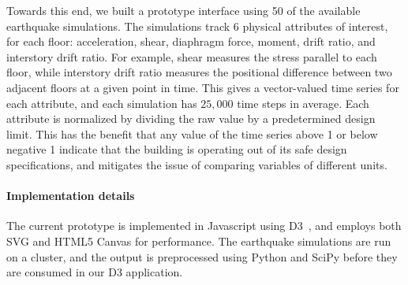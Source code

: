 Towards this end, we built a prototype interface using 50 of the available earthquake simulations.
The simulations track 6 physical attributes of interest, for each floor: acceleration, shear, diaphragm force, moment, drift ratio, and interstory drift ratio. For example, shear measures the stress parallel to each floor, while interstory drift ratio measures the positional difference between two adjacent floors at a given point in time. 
This gives a vector-valued time series for each attribute, and each simulation has $25,000$ time steps in average.
Each attribute is normalized by dividing the raw value by a predetermined design limit. This has the benefit that any value of the time series above 1 or below negative 1 indicate that the building is operating out of its safe design specifications, and mitigates the issue of comparing variables of different units.

\paragraph*{Implementation details}
The current prototype is implemented in Javascript using D3~\cite{Bostock:2011:DDD:2068462.2068631}, and employs both SVG and HTML5 Canvas for performance. The earthquake simulations are run on a cluster, and the output is preprocessed using Python and SciPy before they are consumed in our D3 application.


